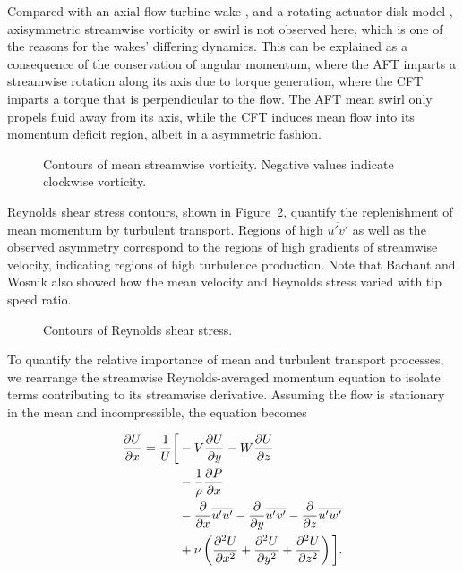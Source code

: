 Compared with an axial-flow turbine wake \cite{Cal2010}, and a rotating actuator
disk model \cite{Wu2011}, axisymmetric streamwise vorticity or swirl is not
observed here, which is one of the reasons for the wakes' differing dynamics.
This can be explained as a consequence of the conservation of angular momentum,
where the AFT imparts a streamwise rotation along its axis due to torque
generation, where the CFT imparts a torque that is perpendicular to the flow.
The AFT mean swirl only propels fluid away from its axis, while the CFT induces
mean flow into its momentum deficit region, albeit in a asymmetric fashion.

\begin{figure}
    \centering
    \caption{Contours of mean streamwise vorticity. Negative values indicate
        clockwise vorticity.}
    \label{fig-xvorticity}
\end{figure}

Reynolds shear stress contours, shown in Figure~\ref{fig-restress}, quantify the
replenishment of mean momentum by turbulent transport. Regions of high
$\overline{u'v'}$ as well as the observed asymmetry correspond to the regions of
high gradients of streamwise velocity, indicating regions of high turbulence
production. Note that Bachant and Wosnik \cite{Bachant2013} also showed how the
mean velocity and Reynolds stress varied with tip speed ratio.

\begin{figure}
    \centering
    \caption{Contours of Reynolds shear stress.}
    \label{fig-restress}
\end{figure}

To quantify the relative importance of mean and turbulent transport processes,
we rearrange the streamwise Reynolds-averaged momentum equation to isolate terms
contributing to its streamwise derivative. Assuming the flow is stationary in
the mean and incompressible, the equation becomes

\begin{equation}
    \begin{split}
        \frac{\partial U}{\partial x}  =  
        \frac{1}{U} \bigg{[}
        & - V\frac{\partial U}{\partial y}
        - W\frac{\partial U}{\partial z} \\
        & -\frac{1}{\rho}\frac{\partial P}{\partial x} \\
        & - \frac{\partial}{\partial x} \overline{u'u'}
        - \frac{\partial}{\partial y} \overline{u'v'}
        - \frac{\partial}{\partial z} \overline{u'w'} \\
        & + \nu\left(\frac{\partial^2 U}{\partial x^2}
        + \frac{\partial^2 U}{\partial y^2}
        + \frac{\partial^2 U}{\partial z^2} \right)
        \bigg{]}.
    \end{split}
\label{eq:momentum}
\end{equation}

